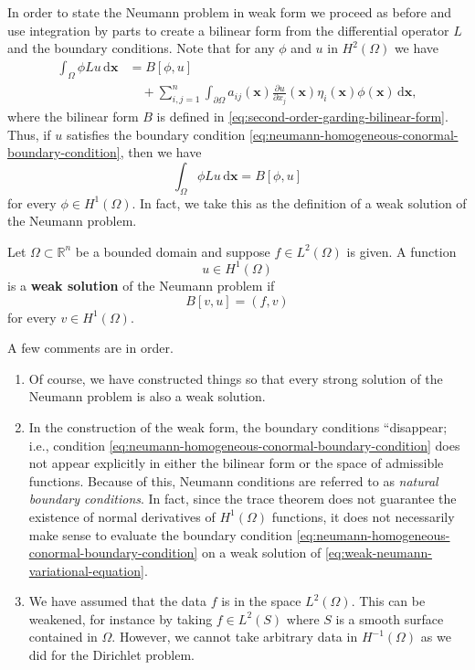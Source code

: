 In order to state the Neumann problem in weak form we proceed as before and use integration by parts to create a bilinear form from the differential operator $L$ and the boundary conditions. Note that for any $\phi$ and $u$ in $H^2(\Omega)$ we have
\begin{equation}\label{eq:neumann-integration-by-parts-boundary-form}
\begin{aligned}
\int_\Omega\phi Lu\,\mathrm{d}\bm{x}&=B[\phi,u]\\
&\quad+\sum_{i,j=1}^n\int_{\partial\Omega}a_{ij}(\bm{x})\frac{\partial u}{\partial x_j}(\bm{x})\eta_i(\bm{x})\phi(\bm{x})\,\mathrm{d}\bm{x},
\end{aligned}
\end{equation}
where the bilinear form $B$ is defined in \eqref{eq:second-order-garding-bilinear-form}. Thus, if $u$ satisfies the boundary condition \eqref{eq:neumann-homogeneous-conormal-boundary-condition}, then we have
\begin{equation}\label{eq:neumann-natural-variational-integration-identity}
\int_\Omega\phi Lu\,\mathrm{d}\bm{x}=B[\phi,u]
\end{equation}
for every $\phi\in H^1(\Omega)$. In fact, we take this as the definition of a weak solution of the Neumann problem.

\begin{Definition}
\label{def:weak-neumann-solution}
Let $\Omega\subset\mathbb{R}^n$ be a bounded domain and suppose $f\in L^2(\Omega)$ is given. A function\[u\in H^1(\Omega)\]is a \textbf{weak solution} of the Neumann problem if
\begin{equation}\label{eq:weak-neumann-variational-equation}
B[v,u]=(f,v)
\end{equation}
for every $v\in H^1(\Omega)$.
\end{Definition}

A few comments are in order.\begin{enumerate}\item Of course, we have constructed things so that every strong solution of the Neumann problem is also a weak solution.\item In the construction of the weak form, the boundary conditions ``disappear\textquotesingle\textquotesingle; i.e., condition \eqref{eq:neumann-homogeneous-conormal-boundary-condition} does not appear explicitly in either the bilinear form or the space of admissible functions. Because of this, Neumann conditions are referred to as \emph{natural boundary conditions}. In fact, since the trace theorem does not guarantee the existence of normal derivatives of $H^1(\Omega)$ functions, it does not necessarily make sense to evaluate the boundary condition \eqref{eq:neumann-homogeneous-conormal-boundary-condition} on a weak solution of \eqref{eq:weak-neumann-variational-equation}.\item We have assumed that the data $f$ is in the space $L^2(\Omega)$. This can be weakened, for instance by taking $f\in L^2(S)$ where $S$ is a smooth surface contained in $\Omega$. However, we cannot take arbitrary data in $H^{-1}(\Omega)$ as we did for the Dirichlet problem.\end{enumerate}
